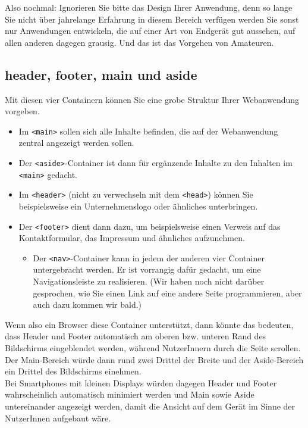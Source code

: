 Also nochmal: Ignorieren Sie bitte das Design Ihrer Anwendung, denn so lange Sie nicht über jahrelange Erfahrung in diesem Bereich verfügen werden Sie sonst nur Anwendungen entwickeln, die auf einer Art von Endgerät gut aussehen, auf allen anderen dagegen grausig. Und das ist das Vorgehen von Amateuren.

\subsection{header, footer, main und aside}

Mit diesen vier Containern können Sie eine grobe Struktur Ihrer Webanwendung vorgeben.

\begin{itemize}
	\item Im \verb|<main>| sollen sich alle Inhalte befinden, die auf der Webanwendung zentral angezeigt werden sollen.
	\item Der \verb|<aside>|-Container ist dann für ergänzende Inhalte zu den Inhalten im \verb|<main>| gedacht.
	\item Im \verb|<header>| (nicht zu verwechseln mit dem \verb|<head>|) können Sie beispielsweise ein Unternehmenslogo oder ähnliches unterbringen.
	\item Der \verb|<footer>| dient dann dazu, um beispielsweise einen Verweis auf das Kontaktformular, das Impressum und ähnliches aufzunehmen.
	\begin{itemize}
		\item Der \verb|<nav>|-Container kann in jedem der anderen vier Container untergebracht werden. Er ist vorrangig dafür gedacht, um eine Navigationsleiste zu realisieren. (Wir haben noch nicht darüber gesprochen, wie Sie einen Link auf eine andere Seite programmieren, aber auch dazu kommen wir bald.)
	\end{itemize}
\end{itemize}

Wenn also ein Browser diese Container unterstützt, dann könnte das bedeuten, dass Header und Footer automatisch am oberen bzw. unteren Rand des Bildschirms eingeblendet werden, während NutzerInnern durch die Seite scrollen. Der Main-Bereich würde dann rund zwei Drittel der Breite und der Aside-Bereich ein Drittel des Bildschirms einehmen.\\

Bei Smartphones mit kleinen Displays würden dagegen Header und Footer wahrscheinlich automatisch minimiert werden und Main sowie Aside untereinander angezeigt werden, damit die Ansicht auf dem Gerät im Sinne der NutzerInnen aufgebaut wäre.\\

